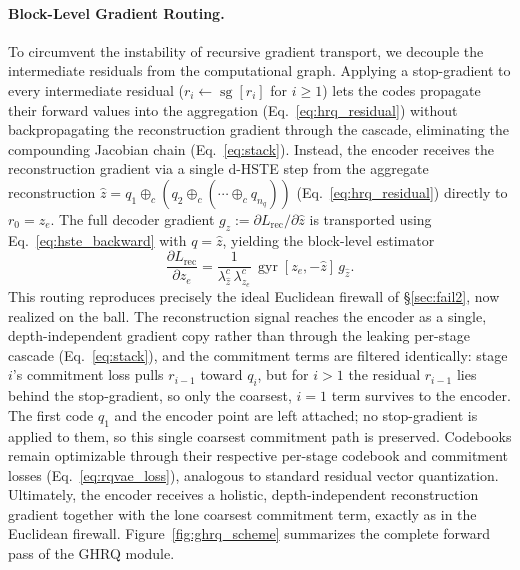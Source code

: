 \documentclass[12pt]{report}
\begin{document}
\paragraph{Block-Level Gradient Routing.}
To circumvent the instability of recursive gradient transport, we decouple the intermediate residuals from the computational graph. Applying a stop-gradient to every intermediate residual ($r_i\leftarrow\operatorname{sg}[r_i]$ for $i\ge 1$) lets the codes propagate their forward values into the aggregation (Eq.~\ref{eq:hrq_residual}) without backpropagating the reconstruction gradient through the cascade, eliminating the compounding Jacobian chain (Eq.~\ref{eq:stack}). Instead, the encoder receives the reconstruction gradient via a single d-HSTE step from the aggregate reconstruction $\hat z = q_1\oplus_c(q_2\oplus_c(\cdots\oplus_c q_{n_q}))$ (Eq.~\ref{eq:hrq_residual}) directly to $r_0=z_e$. The full decoder gradient $g_{\hat z}:=\partial L_{\text{rec}}/\partial\hat z$ is transported using Eq.~\ref{eq:hste_backward} with $q=\hat z$, yielding the block-level estimator
\begin{equation}
    \label{eq:hste_riemannian}
    \frac{\partial L_{\text{rec}}}{\partial z_e}
    = \frac{1}{\lambda^c_{\hat z}\,\lambda^c_{z_e}}\,\operatorname{gyr}[z_e,-\hat z]\,g_{\hat z} .
\end{equation}
This routing reproduces precisely the ideal Euclidean firewall of \S\ref{sec:fail2}, now realized on the ball. The reconstruction signal reaches the encoder as a single, depth-independent gradient copy rather than through the leaking per-stage cascade (Eq.~\ref{eq:stack}), and the commitment terms are filtered identically: stage $i$'s commitment loss pulls $r_{i-1}$ toward $q_i$, but for $i>1$ the residual $r_{i-1}$ lies behind the stop-gradient, so only the coarsest, $i=1$ term survives to the encoder. The first code $q_1$ and the encoder point are left attached; no stop-gradient is applied to them, so this single coarsest commitment path is preserved. Codebooks remain optimizable through their respective per-stage codebook and commitment losses (Eq.~\ref{eq:rqvae_loss}), analogous to standard residual vector quantization. Ultimately, the encoder receives a holistic, depth-independent reconstruction gradient together with the lone coarsest commitment term, exactly as in the Euclidean firewall. Figure~\ref{fig:ghrq_scheme} summarizes the complete forward pass of the GHRQ module.
\end{document}
